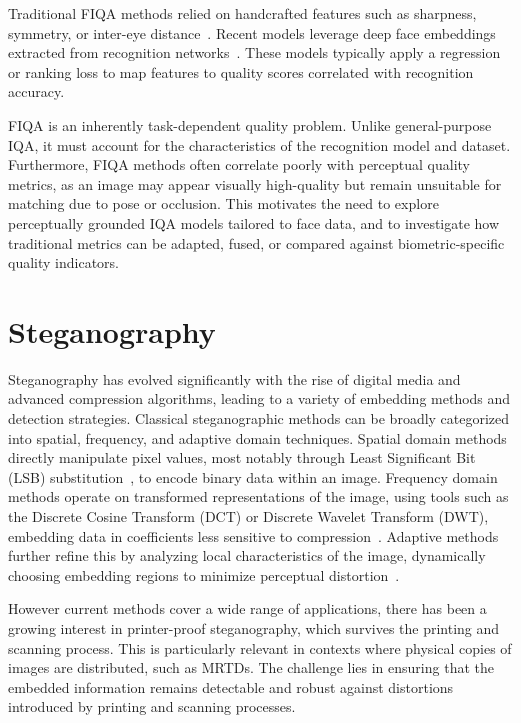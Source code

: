 Traditional FIQA methods relied on handcrafted features such as sharpness, symmetry, or inter-eye distance~\cite{grother2003facequality}. Recent models leverage deep face embeddings extracted from recognition networks~\cite{terhorst2020serfiq, terhorst2022quality}. These models typically apply a regression or ranking loss to map features to quality scores correlated with recognition accuracy.

FIQA is an inherently task-dependent quality problem. Unlike general-purpose IQA, it must account for the characteristics of the recognition model and dataset. Furthermore, FIQA methods often correlate poorly with perceptual quality metrics, as an image may appear visually high-quality but remain unsuitable for matching due to pose or occlusion. This motivates the need to explore perceptually grounded IQA models tailored to face data, and to investigate how traditional metrics can be adapted, fused, or compared against biometric-specific quality indicators.

\section{Steganography}\label{sec:steganography}

Steganography has evolved significantly with the rise of digital media and advanced compression algorithms, leading to a variety of embedding methods and detection strategies. Classical steganographic methods can be broadly categorized into spatial, frequency, and adaptive domain techniques. Spatial domain methods directly manipulate pixel values, most notably through Least Significant Bit (LSB) substitution~\cite{steganography2017}, to encode binary data within an image. Frequency domain methods operate on transformed representations of the image, using tools such as the Discrete Cosine Transform (DCT) or Discrete Wavelet Transform (DWT), embedding data in coefficients less sensitive to compression~\cite{steganography2016survey}. Adaptive methods further refine this by analyzing local characteristics of the image, dynamically choosing embedding regions to minimize perceptual distortion~\cite{steganography2018adaptive}.

However current methods cover a wide range of applications, there has been a growing interest in printer-proof steganography, which survives the printing and scanning process. This is particularly relevant in contexts where physical copies of images are distributed, such as MRTDs. The challenge lies in ensuring that the embedded information remains detectable and robust against distortions introduced by printing and scanning processes.

